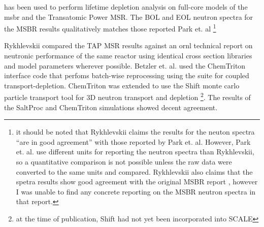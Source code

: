 \SaltProc has been used to perform lifetime depletion analysis on full-core models of the \Gls{msbr}\cite{rykhlevskii_modeling_2019}
and the Transatomic Power MSR\cite{rykhlevskii_fuel_2020}. The BOL and EOL neutron spectra
for the MSBR results qualitatively matches those reported Park et. al \cite{park_whole_2015}\footnote{it should be noted that Rykhlevskii claims the results for the neuton spectra ``are in good agreement'' with those reported by Park et. al. However, Park et. al. use different units for reporting the neutron spectra than Rykhlevskii, so a quantitative comparison is not possible unless the raw data were converted to the same units and compared. Rykhlevskii also claims that the spetra
results show good agreement with the original MSBR report \cite{robertson_conceptual_1971}, however I was unable to find any concrete reporting on the MSBR neutron spectra in that report.}

Rykhlevskii compared the TAP MSR results against an \Gls{ornl} technical report on neutronic performance of the same reactor\cite{betzler_assessment_2017} using identical cross section libraries and model parameters wherever possible. Betzler et. al. used the ChemTriton\cite{betzler_molten_2017} interface code that perfoms batch-wise reprocessing using
the \SCALE suite for coupled transport-depletion. ChemTriton was extended to use the Shift\cite{davidson_nuclide_2018} monte carlo particle transport tool for 3D neutron transport and depletion \footnote{at the time of publication, Shift had not yet been incorporated into SCALE}. The results of the SaltProc and ChemTriton simulations showed decent agreement.


